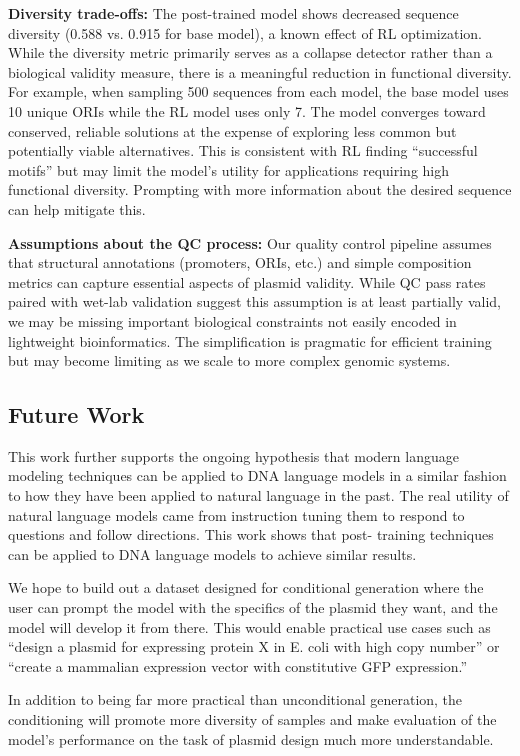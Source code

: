 \documentclass{article}
\theoremstyle{plain}
\theoremstyle{definition}
\theoremstyle{remark}
\begin{document}
\textbf{Diversity trade-offs:} The post-trained model shows decreased
sequence diversity (0.588 vs. 0.915 for base model), a known effect of RL
optimization. While the diversity metric primarily serves as a collapse
detector rather than a biological validity measure, there is a meaningful
reduction in functional diversity. For example, when sampling 500
sequences from each model, the base model uses 10 unique ORIs while the
RL model uses only 7. The model converges toward conserved, reliable
solutions at the expense of exploring less common but potentially viable
alternatives. This is consistent with RL finding ``successful motifs''
but may limit the model's utility for applications requiring high
functional diversity. Prompting with more information about the desired sequence can help mitigate this.

\textbf{Assumptions about the QC process:} Our quality control pipeline
assumes that structural annotations (promoters, ORIs, etc.) and
simple composition metrics can capture essential aspects of plasmid
validity. While QC pass rates paired with wet-lab validation suggest this assumption is at least partially
valid, we may be missing important biological constraints not easily
encoded in lightweight bioinformatics. The simplification is pragmatic
for efficient training but may become limiting as we scale to more
complex genomic systems.

\subsection{Future Work}

This work further supports the ongoing hypothesis that modern language 
modeling techniques can be applied to DNA language models in a similar 
fashion to how they have been applied to natural language in the past. 
The real utility of natural language models came from instruction tuning 
them to respond to questions and follow directions. This work shows that post-
training techniques can be applied to DNA language models to achieve similar results.

We hope to build out a dataset designed for conditional generation where
the user can prompt the model with the specifics of the plasmid they
want, and the model will develop it from there. This would enable
practical use cases such as ``design a plasmid for expressing protein X
in E. coli with high copy number'' or ``create a mammalian expression
vector with constitutive GFP expression.''

In addition to being far more practical than unconditional generation, the
conditioning will promote more diversity of samples and make evaluation
of the model's performance on the task of plasmid design much more
understandable.
\end{document}
